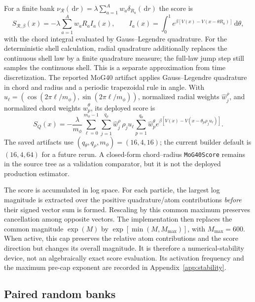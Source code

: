\documentclass[11pt]{article}
\newcommand{\dd}{\,\mathrm{d}}
\begin{document}
For a finite bank
$\nu_{\mathcal R}(\dd r)=\lambda\sum_{a=1}^{A}w_a\delta_{R_a}(\dd r)$ the
score is
\begin{equation}
 S_{\mathcal R,\beta}(x)
 =-\lambda\sum_{a=1}^{A}w_aR_a I_a(x),\qquad
 I_a(x)=\int_0^1e^{\beta[V(x)-V(x-\theta R_a)]}\dd\theta,
 \label{eq:finite-bank-score}
\end{equation}
with the chord integral evaluated by Gauss--Legendre quadrature.  For the
deterministic shell calculation, radial quadrature additionally replaces the
continuous shell law by a finite quadrature measure; the full-law jump step
still samples the continuous shell.  This is a separate approximation from
time discretization.  The reported MoG40 artifact applies Gauss--Legendre
quadrature in chord and radius and a periodic trapezoidal rule in angle.  With
$u_\ell=(\cos(2\pi\ell/m_\phi),\sin(2\pi\ell/m_\phi))$, normalized radial
weights $\widehat w_j^\rho$, and normalized chord weights
$\widehat w_p^\theta$, its deployed score is
\begin{equation}
 S_Q(x)=-\frac{\lambda}{m_\phi}
 \sum_{\ell=0}^{m_\phi-1}\sum_{j=1}^{q_\rho}
 \widehat w_j^\rho\,\rho_j u_\ell
 \sum_{p=1}^{q_\theta}\widehat w_p^\theta
 e^{\beta[V(x)-V(x-\theta_p\rho_j u_\ell)]}.
 \label{eq:mog40-numerical-score}
\end{equation}
The saved artifacts use $(q_\theta,q_\rho,m_\phi)=(16,4,16)$; the current
builder default is $(16,4,64)$ for a future rerun.  A closed-form chord--radius
\texttt{MoG40Score} remains in the source tree as a
validation comparator, but it is not the deployed production estimator.

The score is accumulated in log space.  For each particle, the largest log
magnitude is extracted over the positive quadrature/atom contributions
\emph{before} their signed vector sum is formed.  Rescaling by this common
maximum preserves cancellation among opposite vectors.  The implementation
then replaces the common magnitude $\exp(M)$ by
$\exp[\min(M,M_{\max})]$, with $M_{\max}=600$.  When active, this cap
preserves the relative atom contributions and the score direction but changes
its overall magnitude.  It is therefore a numerical-stability device, not an
algebraically exact score evaluation.  Its activation frequency and the
maximum pre-cap exponent are recorded in Appendix~\ref{app:stability}.

\subsection{Paired random banks}
\label{app:paired}
\end{document}
